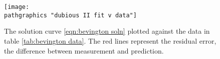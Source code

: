 \begin{figure}[t]
	\texttt{[image: \\pathgraphics "dubious II fit v data"]}
	\caption{The solution curve \eqref{eqn:bevington soln} plotted against the data in table \eqref{tab:bevington data}. The red lines represent the residual error, the difference between measurement and prediction.}
	\label{fig:dubious solution}
\end{figure}

\endinput  %